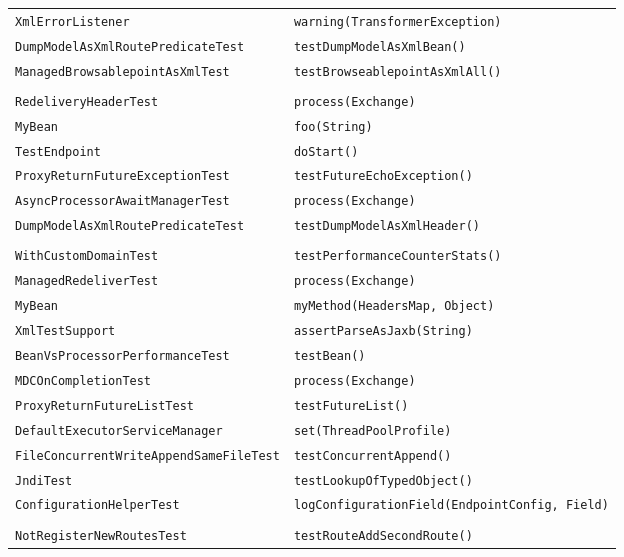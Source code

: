 \begin{center}
\begin{longtable}{ll}
\lstinline/XmlErrorListener/&{\lstinline/warning(TransformerException)/}\\
\lstinline/DumpModelAsXmlRoutePredicateTest/&{\lstinline/testDumpModelAsXmlBean()/}\\
\lstinline/ManagedBrowsablepointAsXmlTest/&{\lstinline/testBrowseablepointAsXmlAll()/}\\
\raisebox{-13pt}{\shortstack{\lstinline/RedeliveryErrorHandlerNonBlocked/-\\\lstinline/RedeliveryHeaderTest/}}&{\lstinline/process(Exchange)/}\\
\lstinline/MyBean/&{\lstinline/foo(String)/}\\
\lstinline/TestEndpoint/&{\lstinline/doStart()/}\\
\lstinline/ProxyReturnFutureExceptionTest/&{\lstinline/testFutureEchoException()/}\\
\lstinline/AsyncProcessorAwaitManagerTest/&{\lstinline/process(Exchange)/}\\
\lstinline/DumpModelAsXmlRoutePredicateTest/&{\lstinline/testDumpModelAsXmlHeader()/}\\
\raisebox{-13pt}{\shortstack{\lstinline/ManagedRouteDumpStatsAsXmlAndReset/-\\\lstinline/WithCustomDomainTest/}}&{\lstinline/testPerformanceCounterStats()/}\\
\lstinline/ManagedRedeliverTest/&{\lstinline/process(Exchange)/}\\
\lstinline/MyBean/&{\lstinline/myMethod(HeadersMap, Object)/}\\
\lstinline/XmlTestSupport/&{\lstinline/assertParseAsJaxb(String)/}\\
\lstinline/BeanVsProcessorPerformanceTest/&{\lstinline/testBean()/}\\
\lstinline/MDCOnCompletionTest/&{\lstinline/process(Exchange)/}\\
\lstinline/ProxyReturnFutureListTest/&{\lstinline/testFutureList()/}\\
\lstinline/DefaultExecutorServiceManager/&{\lstinline/set(ThreadPoolProfile)/}\\
\lstinline/FileConcurrentWriteAppendSameFileTest/&{\lstinline/testConcurrentAppend()/}\\
\lstinline/JndiTest/&{\lstinline/testLookupOfTypedObject()/}\\
\lstinline/ConfigurationHelperTest/&{\lstinline/logConfigurationField(EndpointConfig, Field)/}\\
\raisebox{-13pt}{\shortstack{\lstinline/ManagedRouteAddSecondRoute/-\\\lstinline/NotRegisterNewRoutesTest/}}&{\lstinline/testRouteAddSecondRoute()/}\\

\end{longtable}
\end{center}
